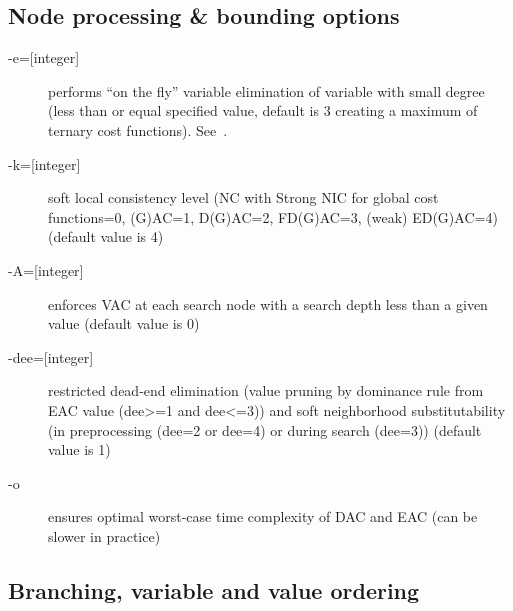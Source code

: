 \documentclass{article}
\begin{document}
\subsection{Node processing \& bounding options}

\begin{description}
\item[{-e=[integer]}] performs ``on the fly'' variable elimination of variable with small
  degree (less than or equal specified value, default is 3 creating a
  maximum of ternary cost functions). See~\cite{Larrosa2000}.
\item[{-k=[integer]}] soft local consistency level (NC with Strong NIC for global cost functions=0, (G)AC=1, D(G)AC=2, FD(G)AC=3, (weak) ED(G)AC=4) (default value is 4)
\item[{-A=[integer]}] enforces VAC at each search node with a search depth less than a given value (default value is 0)
\item[{-dee=[integer]}] restricted dead-end elimination (value pruning by dominance rule from EAC value (dee>=1 and dee<=3)) and soft neighborhood substitutability (in preprocessing (dee=2 or dee=4) or during search (dee=3)) (default value is 1)
\item[{-o}] ensures optimal worst-case time complexity of DAC and EAC (can be slower in practice)
\end{description}

\subsection{Branching, variable and value ordering}
\end{document}
